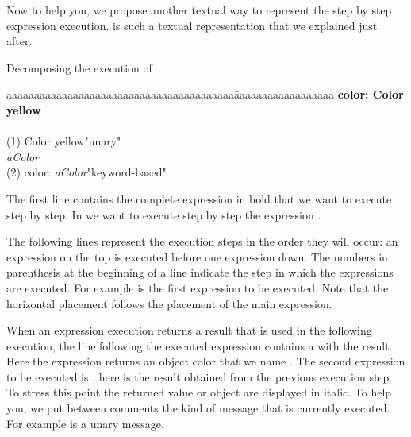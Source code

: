 \newpage
Now to help you, we propose another textual way to represent the step by step expression execution.  is such a textual representation that we explained just after. 

\begin{decomp}{Decomposing the execution of }\label{scr:decColor}
\begin{tabbing}
aaaaaaaaaaaaaaaaaaaaaaaaaaaaaaaaaaaaaaaaa\=aaaaaaaaaaaaaaaaaa\kill
     \textbf{\caro color: Color yellow}\\\\
(1)                    Color yellow\>"unary"\\
                     \returns \emph{aColor}\\
(2)  \caro color: \emph{aColor}\>"keyword-based"
\end{tabbing}
\end{decomp}

The first line contains the complete expression in bold that we want to execute step by step. In  we want to execute step by step the expression . 

The following lines represent the execution steps in the order they will occur: an expression on the top is executed before one expression down. The numbers in parenthesis at the beginning of a line indicate the step in which the expressions are executed. For example  is the first expression to be executed. Note that the horizontal placement follows the placement of the main expression. 

When an expression execution returns a result that is used in the following execution, the line following the executed expression contains a \returns with the result. Here the expression  returns an object color that we name . 
The second expression to be executed is , here  is the result obtained from the previous execution step. To stress this point the returned value or object are displayed in italic. To help you, we put between comments  the kind of message that is currently executed. For example  is a unary message.

 







